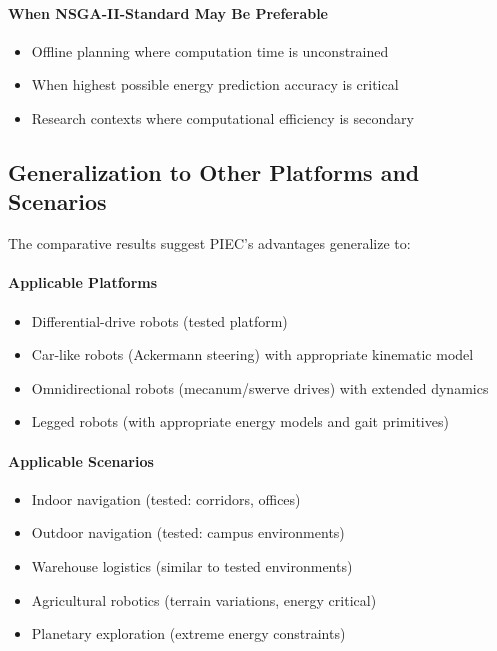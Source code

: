 \paragraph{When NSGA-II-Standard May Be Preferable}
\begin{itemize}
    \item Offline planning where computation time is unconstrained
    \item When highest possible energy prediction accuracy is critical
    \item Research contexts where computational efficiency is secondary
\end{itemize}

\subsection{Generalization to Other Platforms and Scenarios}

The comparative results suggest PIEC's advantages generalize to:

\paragraph{Applicable Platforms}
\begin{itemize}
    \item Differential-drive robots (tested platform)
    \item Car-like robots (Ackermann steering) with appropriate kinematic model
    \item Omnidirectional robots (mecanum/swerve drives) with extended dynamics
    \item Legged robots (with appropriate energy models and gait primitives)
\end{itemize}

\paragraph{Applicable Scenarios}
\begin{itemize}
    \item Indoor navigation (tested: corridors, offices)
    \item Outdoor navigation (tested: campus environments)
    \item Warehouse logistics (similar to tested environments)
    \item Agricultural robotics (terrain variations, energy critical)
    \item Planetary exploration (extreme energy constraints)
\end{itemize}

